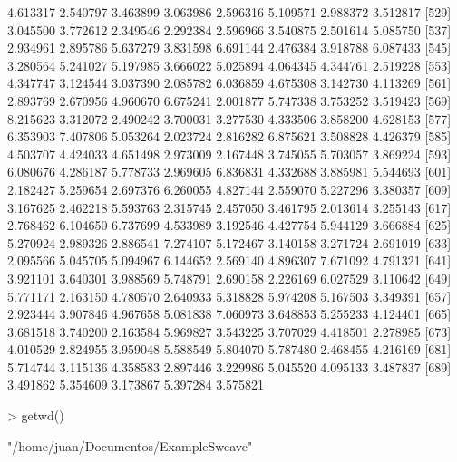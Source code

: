 \documentclass[12pt]{article}
\begin{document}
\begin{Schunk}
\begin{Soutput}
[521] 4.613317 2.540797 3.463899 3.063986 2.596316 5.109571 2.988372 3.512817
[529] 3.045500 3.772612 2.349546 2.292384 2.596966 3.540875 2.501614 5.085750
[537] 2.934961 2.895786 5.637279 3.831598 6.691144 2.476384 3.918788 6.087433
[545] 3.280564 5.241027 5.197985 3.666022 5.025894 4.064345 4.344761 2.519228
[553] 4.347747 3.124544 3.037390 2.085782 6.036859 4.675308 3.142730 4.113269
[561] 2.893769 2.670956 4.960670 6.675241 2.001877 5.747338 3.753252 3.519423
[569] 8.215623 3.312072 2.490242 3.700031 3.277530 4.333506 3.858200 4.628153
[577] 6.353903 7.407806 5.053264 2.023724 2.816282 6.875621 3.508828 4.426379
[585] 4.503707 4.424033 4.651498 2.973009 2.167448 3.745055 5.703057 3.869224
[593] 6.080676 4.286187 5.778733 2.969605 6.836831 4.332688 3.885981 5.544693
[601] 2.182427 5.259654 2.697376 6.260055 4.827144 2.559070 5.227296 3.380357
[609] 3.167625 2.462218 5.593763 2.315745 2.457050 3.461795 2.013614 3.255143
[617] 2.768462 6.104650 6.737699 4.533989 3.192546 4.427754 5.944129 3.666884
[625] 5.270924 2.989326 2.886541 7.274107 5.172467 3.140158 3.271724 2.691019
[633] 2.095566 5.045705 5.094967 6.144652 2.569140 4.896307 7.671092 4.791321
[641] 3.921101 3.640301 3.988569 5.748791 2.690158 2.226169 6.027529 3.110642
[649] 5.771171 2.163150 4.780570 2.640933 5.318828 5.974208 5.167503 3.349391
[657] 2.923444 3.907846 4.967658 5.081838 7.060973 3.648853 5.255233 4.124401
[665] 3.681518 3.740200 2.163584 5.969827 3.543225 3.707029 4.418501 2.278985
[673] 4.010529 2.824955 3.959048 5.588549 5.804070 5.787480 2.468455 4.216169
[681] 5.714744 3.115136 4.358583 2.897446 3.229986 5.045520 4.095133 3.487837
[689] 3.491862 5.354609 3.173867 5.397284 3.575821
\end{Soutput}
\begin{Sinput}
> getwd()
\end{Sinput}
\begin{Soutput}
[1] "/home/juan/Documentos/ExampleSweave"
\end{Soutput}
\end{Schunk}
\end{document}
